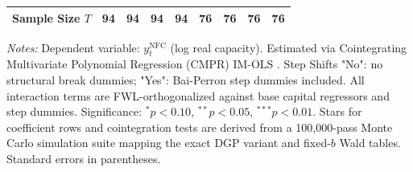 \begin{table}[h!]
\begin{tabular}{p{3.0cm}p{1.25cm}p{1.25cm}p{1.25cm}p{1.25cm}p{1.5cm}p{1.5cm}p{1.5cm}p{1.5cm}}
Sample Size $T$ & 94 & 94 & 94 & 94 & 76 & 76 & 76 & 76 \\
\bottomrule
\end{tabular}
\begin{minipage}{\textwidth}
\scriptsize
\textit{Notes:} Dependent variable: $y_t^{\text{NFC}}$ (log real capacity). Estimated via Cointegrating Multivariate Polynomial Regression (CMPR) IM-OLS \citep{VogelsangWagner2024}. Step Shifts "No": no structural break dummies; "Yes": Bai-Perron step dummies included. All interaction terms are FWL-orthogonalized against base capital regressors and step dummies. Significance: $^*p<0.10$, $^{**}p<0.05$, $^{***}p<0.01$. Stars for coefficient rows and cointegration tests are derived from a 100,000-pass Monte Carlo simulation suite mapping the exact DGP variant and fixed-$b$ Wald tables. Standard errors in parentheses.
\end{minipage}
\end{table}
